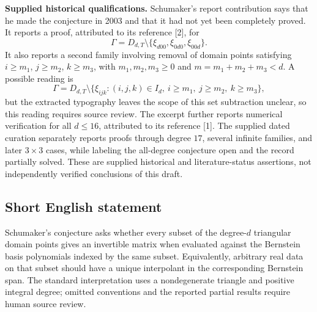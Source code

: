 \documentclass[11pt]{article}
\begin{document}
\textbf{Supplied historical qualifications.} Schumaker's report contribution says that he made the conjecture in 2003 and that it had not yet been completely proved. It reports a proof, attributed to its reference [2], for
\[
\Gamma=D_{d,T}\setminus\{\xi_{d00},\xi_{0d0},\xi_{00d}\}.
\]
It also reports a second family involving removal of domain points satisfying \(i\geq m_1\), \(j\geq m_2\), \(k\geq m_3\), with \(m_1,m_2,m_3\geq0\) and \(m=m_1+m_2+m_3<d\). A possible reading is
\[
\Gamma=D_{d,T}\setminus
\{\xi_{ijk}:(i,j,k)\in I_d,\ i\geq m_1,\ j\geq m_2,\ k\geq m_3\},
\]
but the extracted typography leaves the scope of this set subtraction unclear, so this reading requires source review. The excerpt further reports numerical verification for all \(d\leq16\), attributed to its reference [1]. The supplied dated curation separately reports proofs through degree \(17\), several infinite families, and later \(3\times3\) cases, while labeling the all-degree conjecture open and the record partially solved. These are supplied historical and literature-status assertions, not independently verified conclusions of this draft.
\subsection{Short English statement}
Schumaker's conjecture asks whether every subset of the degree-\(d\) triangular domain points gives an invertible matrix when evaluated against the Bernstein basis polynomials indexed by the same subset. Equivalently, arbitrary real data on that subset should have a unique interpolant in the corresponding Bernstein span. The standard interpretation uses a nondegenerate triangle and positive integral degree; omitted conventions and the reported partial results require human source review.
\end{document}
